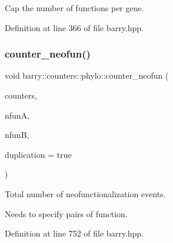 Cap the number of functions per gene. 



Definition at line 366 of file barry.\+hpp.

\mbox{\label{namespacebarry_1_1counters_1_1phylo_a4cf48d44538ec0646783e29e89027838}} 
\subsubsection{\texorpdfstring{counter\+\_\+neofun()}{counter\_neofun()}}
{\footnotesize\ttfamily void barry\+::counters\+::phylo\+::counter\+\_\+neofun (\begin{DoxyParamCaption}\item[{\hyperlink{namespacebarry_1_1counters_1_1phylo_a4e401ffe66d04091343dcffaf915f8c3}{Phylo\+Counters} $\ast$}]{counters,  }\item[{\hyperlink{namespacebarry_a11dfc53ddb4672278319aa04f1e09a6c}{uint}}]{nfunA,  }\item[{\hyperlink{namespacebarry_a11dfc53ddb4672278319aa04f1e09a6c}{uint}}]{nfunB,  }\item[{bool}]{duplication = {\ttfamily true} }\end{DoxyParamCaption})\hspace{0.3cm}{\ttfamily [inline]}}



Total number of neofunctionalization events. 

Needs to specify pairs of function. 

Definition at line 752 of file barry.\+hpp.

\mbox{\label{namespacebarry_1_1counters_1_1phylo_a3394895262bbf1fd603193ef21b9ddb8}} 
